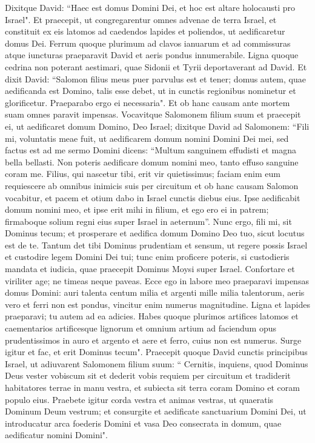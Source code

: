 \begin{biblechapter}  
\verse Dixitque David: “Haec est domus Domini Dei, et hoc est altare holocausti pro Israel". 
\verse Et praecepit, ut congregarentur omnes advenae de terra Israel, et constituit ex eis latomos ad caedendos lapides et poliendos, ut aedificaretur domus Dei.  
\verse Ferrum quoque plurimum ad clavos ianuarum et ad commissuras atque iuncturas praeparavit David et aeris pondus innumerabile. 
\verse Ligna quoque cedrina non poterant aestimari, quae Sidonii et Tyrii deportaverant ad David. 
\verse Et dixit David: “Salomon filius meus puer parvulus est et tener; domus autem, quae aedificanda est Domino, talis esse debet, ut in cunctis regionibus nominetur et glorificetur. Praeparabo ergo ei necessaria". Et ob hanc causam ante mortem suam omnes paravit impensas. 
\verse Vocavitque Salomonem filium suum et praecepit ei, ut aedificaret domum Domino, Deo Israel; 
\verse dixitque David ad Salomonem: “Fili mi, voluntatis meae fuit, ut aedificarem domum nomini Domini Dei mei, 
\verse sed factus est ad me sermo Domini dicens: “Multum sanguinem effudisti et magna bella bellasti. Non poteris aedificare domum nomini meo, tanto effuso sanguine coram me. 
\verse Filius, qui nascetur tibi, erit vir quietissimus; faciam enim eum requiescere ab omnibus inimicis suis per circuitum et ob hanc causam Salomon vocabitur, et pacem et otium dabo in Israel cunctis diebus eius. 
\verse Ipse aedificabit domum nomini meo, et ipse erit mihi in filium, et ego ero ei in patrem; firmaboque solium regni eius super Israel in aeternum”. 
\verse Nunc ergo, fili mi, sit Dominus tecum; et prosperare et aedifica domum Domino Deo tuo, sicut locutus est de te.  
\verse Tantum det tibi Dominus prudentiam et sensum, ut regere possis Israel et custodire legem Domini Dei tui; 
\verse tunc enim proficere poteris, si custodieris mandata et iudicia, quae praecepit Dominus Moysi super Israel. Confortare et viriliter age; ne timeas neque paveas. 
\verse Ecce ego in labore meo praeparavi impensas domus Domini: auri talenta centum milia et argenti mille milia talentorum, aeris vero et ferri non est pondus, vincitur enim numerus magnitudine. Ligna et lapides praeparavi; tu autem ad ea adicies. 
\verse Habes quoque plurimos artifices latomos et caementarios artificesque lignorum et omnium artium ad faciendum opus prudentissimos 
\verse in auro et argento et aere et ferro, cuius non est numerus. Surge igitur et fac, et erit Dominus tecum". 
\verse Praecepit quoque David cunctis principibus Israel, ut adiuvarent Salomonem filium suum: “
\verse Cernitis, inquiens, quod Dominus Deus vester vobiscum sit et dederit vobis requiem per circuitum et tradiderit habitatores terrae in manu vestra, et subiecta sit terra coram Domino et coram populo eius. 
\verse Praebete igitur corda vestra et animas vestras, ut quaeratis Dominum Deum vestrum; et consurgite et aedificate sanctuarium Domini Dei, ut introducatur arca foederis Domini et vasa Deo consecrata in domum, quae aedificatur nomini Domini". 
\end{biblechapter}

